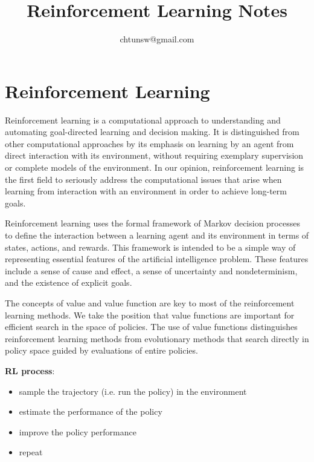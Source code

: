 \documentclass{article}
\title{Reinforcement Learning Notes}
\author{chtunsw@gmail.com}
\date{}
\begin{document}
\maketitle

\clearpage

\tableofcontents{}

\clearpage

\section{Reinforcement Learning}

Reinforcement learning is a computational approach to understanding and automating goal-directed learning and decision making. 
It is distinguished from other computational approaches by its emphasis on learning by an agent from direct interaction with its environment, 
without requiring exemplary supervision or complete models of the environment. In our opinion, reinforcement learning is the first field to seriously 
address the computational issues that arise when learning from interaction with an environment in order to achieve long-term goals.

Reinforcement learning uses the formal framework of Markov decision processes to define the interaction between a learning agent and its environment in terms of states, 
actions, and rewards. This framework is intended to be a simple way of representing essential features of the artificial intelligence problem. These features include a sense of cause and effect, 
a sense of uncertainty and nondeterminism, and the existence of explicit goals.

The concepts of value and value function are key to most of the reinforcement learning methods. 
We take the position that value functions are important for efficient search in the space of policies. 
The use of value functions distinguishes reinforcement learning methods from evolutionary methods that search directly in policy space guided by evaluations of entire policies.

\textbf{RL process}:

\begin{itemize}
    \item sample the trajectory (i.e. run the policy) in the environment
    \item estimate the performance of the policy
    \item improve the policy performance
    \item repeat
\end{itemize}
\end{document}

